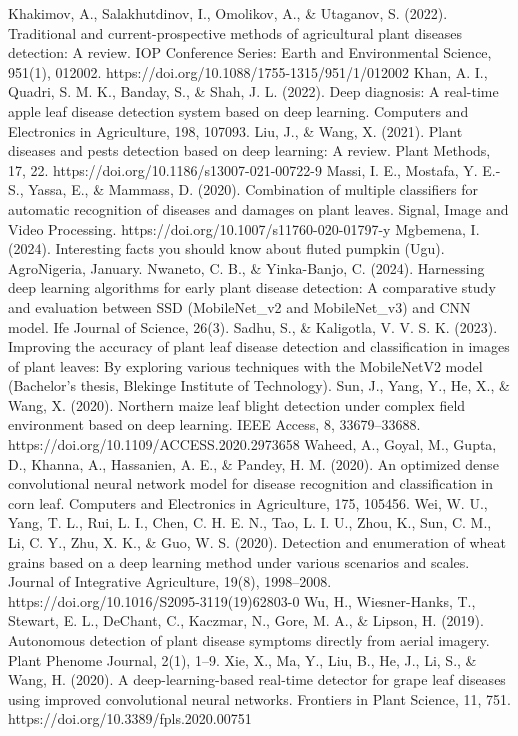 	Khakimov, A., Salakhutdinov, I., Omolikov, A., \& Utaganov, S. (2022). Traditional and current-prospective methods of agricultural plant diseases detection: A review. IOP Conference Series: Earth and Environmental Science, 951(1), 012002. https://doi.org/10.1088/1755-1315/951/1/012002
	Khan, A. I., Quadri, S. M. K., Banday, S., \& Shah, J. L. (2022). Deep diagnosis: A real-time apple leaf disease detection system based on deep learning. Computers and Electronics in Agriculture, 198, 107093.
	Liu, J., \& Wang, X. (2021). Plant diseases and pests detection based on deep learning: A review. Plant Methods, 17, 22. https://doi.org/10.1186/s13007-021-00722-9
	Massi, I. E., Mostafa, Y. E.-S., Yassa, E., \& Mammass, D. (2020). Combination of multiple classifiers for automatic recognition of diseases and damages on plant leaves. Signal, Image and Video Processing. https://doi.org/10.1007/s11760-020-01797-y
	Mgbemena, I. (2024). Interesting facts you should know about fluted pumpkin (Ugu). AgroNigeria, January.
	Nwaneto, C. B., \& Yinka-Banjo, C. (2024). Harnessing deep learning algorithms for early plant disease detection: A comparative study and evaluation between SSD (MobileNet_v2 and MobileNet_v3) and CNN model. Ife Journal of Science, 26(3).
	Sadhu, S., \& Kaligotla, V. V. S. K. (2023). Improving the accuracy of plant leaf disease detection and classification in images of plant leaves: By exploring various techniques with the MobileNetV2 model (Bachelor’s thesis, Blekinge Institute of Technology).
	Sun, J., Yang, Y., He, X., \& Wang, X. (2020). Northern maize leaf blight detection under complex field environment based on deep learning. IEEE Access, 8, 33679–33688. https://doi.org/10.1109/ACCESS.2020.2973658
	Waheed, A., Goyal, M., Gupta, D., Khanna, A., Hassanien, A. E., \& Pandey, H. M. (2020). An optimized dense convolutional neural network model for disease recognition and classification in corn leaf. Computers and Electronics in Agriculture, 175, 105456.
	Wei, W. U., Yang, T. L., Rui, L. I., Chen, C. H. E. N., Tao, L. I. U., Zhou, K., Sun, C. M., Li, C. Y., Zhu, X. K., \& Guo, W. S. (2020). Detection and enumeration of wheat grains based on a deep learning method under various scenarios and scales. Journal of Integrative Agriculture, 19(8), 1998–2008. https://doi.org/10.1016/S2095-3119(19)62803-0
	Wu, H., Wiesner-Hanks, T., Stewart, E. L., DeChant, C., Kaczmar, N., Gore, M. A., \& Lipson, H. (2019). Autonomous detection of plant disease symptoms directly from aerial imagery. Plant Phenome Journal, 2(1), 1–9.
	Xie, X., Ma, Y., Liu, B., He, J., Li, S., \& Wang, H. (2020). A deep-learning-based real-time detector for grape leaf diseases using improved convolutional neural networks. Frontiers in Plant Science, 11, 751. https://doi.org/10.3389/fpls.2020.00751
